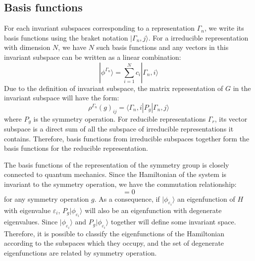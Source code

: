 \documentclass{article}
\begin{document}
\subsection{Basis functions}
For each invariant subspaces corresponding to a representation $\Gamma_n$, we write its basis 
functions using the braket notation $|\Gamma_n,j\rangle$. For a irreducible representation with 
dimension $N$, we have $N$ such basis functions and any vectors in this invariant subspace 
can be written as a linear combination:
\begin{equation}
    |\phi^{\Gamma_n}\rangle = \sum_{i = 1}^N c_i |\Gamma_n,i\rangle
\end{equation} 
Due to the definition of invariant subspace, the matrix representation of $G$ in the invariant 
subspace will have the form:
\begin{equation}
    \rho^{\Gamma_n}(g)_{ij} = \langle \Gamma_n,i | P_g | \Gamma_n,j \rangle
\end{equation}
where $P_g$ is the symmetry operation. 
For reducible representations $\Gamma_{r}$, its vector subspace is a direct sum of all the subspace 
of irreducible representations it contains. Therefore, basis functions from irreducible 
subspaces together form the basis functions for the reducible representation.

The basis functions of the representation of the symmetry group is closely connected to quantum mechanics.
Since the Hamiltonian of the system is invariant to the symmetry operation, we have the commutation 
relationship:
\begin{equation}
    [P_g,H] = 0
\end{equation}
for any symmetry operation $g$. As a consequence, if $|\phi_{\varepsilon_i}\rangle$ an eigenfunction of $H$
with eigenvalue $\varepsilon_i$, $P_g|\phi_{\varepsilon_i}\rangle$ will also be an eigenfunction 
with degenerate eigenvalues. Since $|\phi_{\varepsilon_i}\rangle$ and $P_g|\phi_{\varepsilon_i}\rangle$
together will define some invariant space. Therefore, it is possible to classify the eigenfunctions of the 
Hamiltonian according to the subspaces which they occupy, and the set of degenerate eigenfunctions are 
related by symmetry operation. 
\end{document}

